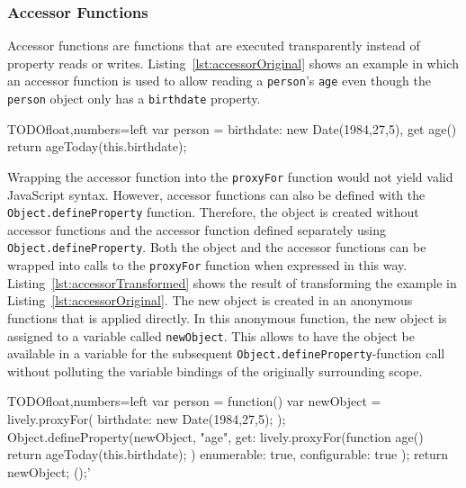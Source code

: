 \subsubsection{Accessor Functions}

Accessor functions are functions that are executed transparently instead of property reads or writes.
Listing~\ref{lst:accessorOriginal} shows an example in which an accessor function is used to allow reading a \lstinline{person}'s \lstinline{age} even though the \lstinline{person} object only has a \lstinline{birthdate} property.

\begin{code}{TODO}{float,numbers=left}
var person = {
    birthdate: new Date(1984,27,5),
    get age() {
        return ageToday(this.birthdate);
    }
}
\end{code}
\iffalse
\end{verbatim}\fi

Wrapping the accessor function into the \lstinline{proxyFor} function would not yield valid JavaScript syntax.
However, accessor functions can also be defined with the \lstinline{Object.defineProperty} function.
Therefore, the object is created without accessor functions and the accessor function defined separately using \lstinline{Object.defineProperty}.
Both the object and the accessor functions can be wrapped into calls to the \lstinline{proxyFor} function when expressed in this way.
Listing~\ref{lst:accessorTransformed} shows the result of transforming the example in Listing~\ref{lst:accessorOriginal}.
The new object is created in an anonymous functions that is applied directly.
In this anonymous function, the new object is assigned to a variable called \lstinline{newObject}.
This allows to have the object be available in a variable for the subsequent \lstinline{Object.defineProperty}-function call without polluting the variable bindings of the originally surrounding scope.

\begin{code}{TODO}{float,numbers=left}
var person = function() {
    var newObject = lively.proxyFor({
        birthdate: new Date(1984,27,5);
    });
    Object.defineProperty(newObject, "age", {
        get: lively.proxyFor(function age() {
            return ageToday(this.birthdate);
        })
        enumerable: true,
        configurable: true
    });
    return newObject;
}();'
\end{code}
\iffalse
\end{verbatim}\fi



